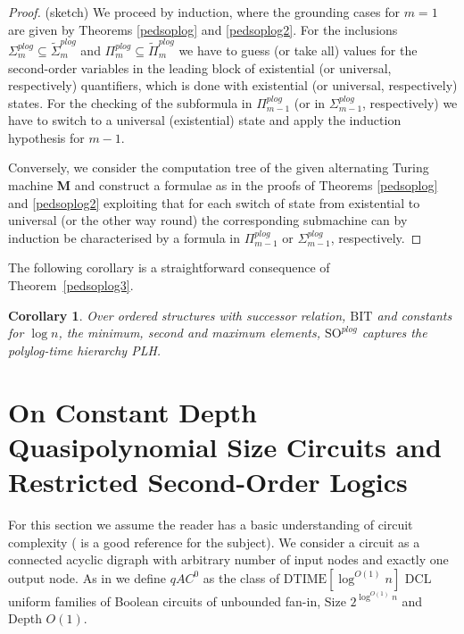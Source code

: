 \documentclass{article}
\newtheorem{corollary}{Corollary}
\begin{document}
\begin{proof} (sketch)
We proceed by induction, where the grounding cases for $m=1$ are given by Theorems \ref{pedsoplog} and \ref{pedsoplog2}. For the inclusions $\Sigma^{\mathit{plog}}_m \subseteq \tilde{\Sigma}^{\mathit{plog}}_m$ and $\Pi^{\mathit{plog}}_m \subseteq \tilde{\Pi}^{\mathit{plog}}_m$ we have to guess (or take all) values for the second-order variables in the leading block of existential (or universal, respectively) quantifiers, which is done with existential (or universal, respectively) states. For the checking of the subformula in $\Pi^{\mathit{plog}}_{m-1}$ (or in $\Sigma^{\mathit{plog}}_{m-1}$, respectively) we have to switch to a universal (existential) state and apply the induction hypothesis for $m-1$.

Conversely, we consider the computation tree of the given alternating Turing machine \textbf{M} and construct a formulae as in the proofs of Theorems \ref{pedsoplog} and \ref{pedsoplog2} exploiting that for each switch of state from existential to universal (or the other way round) the corresponding submachine can by induction be characterised by a formula in $\Pi^{\mathit{plog}}_{m-1}$ or $\Sigma^{\mathit{plog}}_{m-1}$, respectively.
\end{proof}

The following corollary is a straightforward consequence of Theorem~\ref{pedsoplog3}.
\begin{corollary}

Over ordered structures with successor relation, $\mathrm{BIT}$ and constants for $\log n$, the minimum, second and maximum elements, $\mathrm{SO}^{\mathit{plog}}$ captures the polylog-time hierarchy PLH.

\end{corollary}



\section{On Constant Depth Quasipolynomial Size Circuits and Restricted Second-Order Logics}\label{barrington}


For this section we assume the reader has a basic understanding of circuit complexity (\cite{Immerman99} is a good reference for the subject). We consider a circuit as a connected acyclic digraph with arbitrary number of input nodes and exactly one output node. As in \cite{Barr92} we define  $qAC^0$ as the class of $\mathrm{DTIME} [\log^{O(1)} n]$ $\mathrm{DCL}$ uniform families of Boolean circuits of unbounded fan-in, Size $2^{\log^{O(1)} n}$ and Depth $O(1)$.
\end{document}
